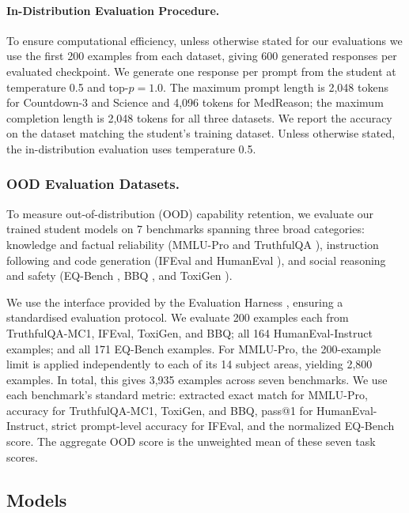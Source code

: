 \documentclass{article} %
\theoremstyle{plain}
\theoremstyle{definition}
\theoremstyle{remark}
\begin{document}
\paragraph{In-Distribution Evaluation Procedure.} To ensure computational efficiency, unless otherwise stated for our evaluations we use the first 200 examples from each dataset, giving 600 generated responses per evaluated checkpoint. We generate one response per prompt from the student at temperature 0.5 and top-$p=1.0$. The maximum prompt length is 2,048 tokens for Countdown-3 and Science and 4,096 tokens for MedReason; the maximum completion length is 2,048 tokens for all three datasets. We report the accuracy on the dataset matching the student's training dataset. Unless otherwise stated, the in-distribution evaluation uses temperature 0.5.

\subsubsection{OOD Evaluation Datasets.}
\label{app:ood_eval}
To measure out-of-distribution (OOD) capability retention, we evaluate our trained student models on 7 benchmarks spanning three broad categories: knowledge and factual reliability (MMLU-Pro \citep{NEURIPS2024_ad236edc} and TruthfulQA \citep{lin-etal-2022-truthfulqa}), instruction following and code generation (IFEval \citep{zhou2023instructionfollowingevaluationlargelanguage} and HumanEval \citep{chen2021evaluating}), and social reasoning and safety (EQ-Bench \citep{paech2024eqbenchemotionalintelligencebenchmark}, BBQ \citep{parrish-etal-2022-bbq}, and ToxiGen \citep{hartvigsen-etal-2022-toxigen}).

We use the interface provided by the Evaluation Harness \citep{eval-harness}, ensuring a standardised evaluation protocol. We evaluate 200 examples each from TruthfulQA-MC1, IFEval, ToxiGen, and BBQ; all 164 HumanEval-Instruct examples; and all 171 EQ-Bench examples. For MMLU-Pro, the 200-example limit is applied independently to each of its 14 subject areas, yielding 2,800 examples. In total, this gives 3,935 examples across seven benchmarks. We use each benchmark's standard metric: extracted exact match for MMLU-Pro, accuracy for TruthfulQA-MC1, ToxiGen, and BBQ, pass@1 for HumanEval-Instruct, strict prompt-level accuracy for IFEval, and the normalized EQ-Bench score. The aggregate OOD score is the unweighted mean of these seven task scores.

\subsection{Models}
\end{document}
